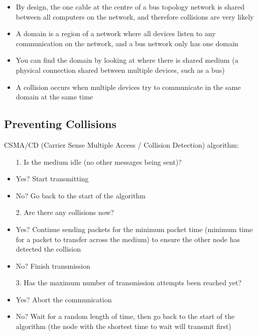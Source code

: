 
\begin{itemize}
  \item By design, the one cable at the centre of a bus topology network is shared between all computers on the network, and therefore collisions are very likely
  \item A domain is a region of a network where all devices listen to any communication on the network, and a bus network only has one domain
  \item You can find the domain by looking at where there is shared medium (a physical connection shared between multiple devices, such as a bus)
  \item A collision occurs when multiple devices try to communicate in the same domain at the same time
\end{itemize}

\subsection*{Preventing Collisions}

CSMA/CD (Carrier Sense Multiple Access / Collision Detection) algorithm:
\begin{itemize}
  \item[1.] Is the medium idle (no other messages being sent)?
  \item Yes? Start transmitting
  \item No? Go back to the start of the algorithm
  \item[2.] Are there any collisions now?
  \item Yes? Continue sending packets for the minimum packet time (minimum time for a packet to transfer across the medium) to ensure the other node has detected the collision
  \item No? Finish transmission
  \item[3.] Has the maximum number of transmission attempts been reached yet?
  \item Yes? Abort the communication
  \item No? Wait for a random length of time, then go back to the start of the algorithm (the node with the shortest time to wait will transmit first)
\end{itemize}